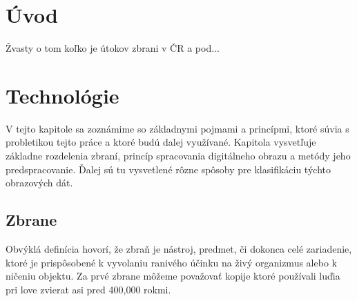 \chapter{Úvod}

Žvasty o tom koľko je útokov zbrani v ČR a pod...


\chapter{Technológie}

V tejto kapitole sa zoznámime so základnymi pojmami a princípmi, ktoré súvia s probletikou tejto práce a ktoré budú dalej využívané.
Kapitola vysvetľuje základne rozdelenia zbraní, princíp spracovania digitálneho obrazu a metódy jeho predspracovanie.
Ďalej sú tu vysvetlené rôzne spôsoby pre klasifikáciu týchto obrazových dát.


\section{Zbrane}
Obvýklá definícia hovorí, že zbraň je nástroj, predmet, či dokonca celé zariadenie,
ktoré je prispôsobené k vyvolaniu ranivého účinku na živý organizmus alebo k ničeniu objektu\cite{book:StrelneZbrane}.
Za prvé zbrane môžeme považovať kopije ktoré používali luďia pri love zvierat asi pred 400,000 rokmi\cite{prop:SpearHistory}.

